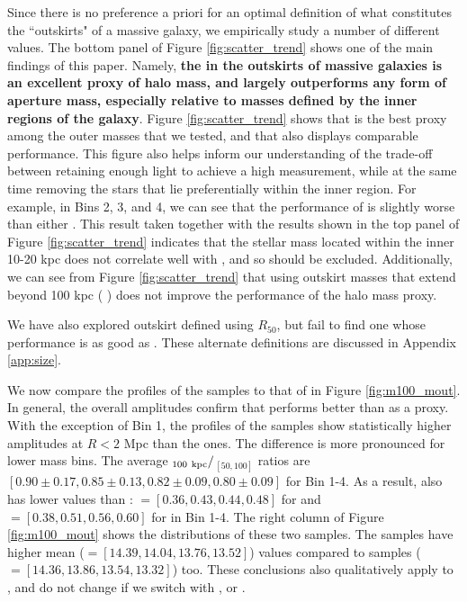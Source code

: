\documentclass[fleqn,usenatbib,useAMS]{mnras}
\begin{document}
\begin{CJK*}{UTF8}{gbsn}
    Since there is no preference a priori for an optimal definition of what constitutes the
    ``outskirts" of a massive galaxy, we empirically study a number of different values. 
    The bottom panel of Figure \ref{fig:scatter_trend} shows one of the main findings of this paper. 
    Namely, \textbf{the \mstar{} in the outskirts of massive galaxies is an excellent proxy of halo mass,
    and largely outperforms any form of aperture mass, especially relative to masses defined by the
    inner regions of the galaxy}.
    Figure \ref{fig:scatter_trend} shows that  is the best \mvir{} proxy among the
    outer masses that we tested, and that  also displays comparable performance. 
    This figure also helps inform our understanding of the trade-off between retaining enough light
    to achieve a high \snratio{} measurement, while at the same time removing the \insitu{} stars
    that lie preferentially within the inner region. 
    For example, in Bins 2, 3, and 4, we can see that the performance of  is slightly
    worse than either  . 
    This result taken together with the results shown in the top panel of Figure
    \ref{fig:scatter_trend} indicates that the stellar mass located within the inner 10-20 kpc does
    not correlate well with \mvir{}, and so should be excluded.
    Additionally, we can see from Figure \ref{fig:scatter_trend} that using outskirt masses that
    extend beyond 100 kpc (\eg{} ) does not improve the performance of the halo mass
    proxy.
    
    We have also explored outskirt \mstar{} defined using $R_{50}$, but fail to find one whose
    performance is as good as . 
    These alternate definitions are discussed in Appendix \ref{app:size}. 
    
    We now compare the \dsigma{} profiles of the  \topn{} samples to that of
     in Figure \ref{fig:m100_mout}.
    In general, the overall amplitudes confirm that  performs better than 
    as a \mvir{} proxy.
    With the exception of Bin 1, the \dsigma{} profiles of the  samples show
    statistically higher amplitudes at $R < 2$ Mpc than the  ones.
    The difference is more pronounced for lower mass bins.  
    The average \dsigma{}$_{100\ \rm kpc}/$\dsigma{}$_{[50,100]}$ ratios are
    $[0.90\pm0.17, 0.85\pm0.13, 0.82\pm0.09, 0.80\pm0.09]$ for Bin 1-4.
    As a result,  also has lower \sigmvir{} values than : 
    \sigmvir{}$=[0.36, 0.43, 0.44, 0.48]$ for  and 
    \sigmvir{}$=[0.38, 0.51, 0.56, 0.60]$ for  in Bin 1-4.
    The right column of Figure \ref{fig:m100_mout} shows the \mvir{} distributions of these two
    samples.
    The  samples have higher mean \mvir{} (\logmvir{}$=[14.39, 14.04, 13.76, 13.52]$)
    values compared to  samples (\logmvir{}$=[14.36, 13.86, 13.54, 13.32]$) too.
    These conclusions also qualitatively apply to , and do not change if we switch
     with , or \mmax{}.


\end{CJK*}
\end{document}
